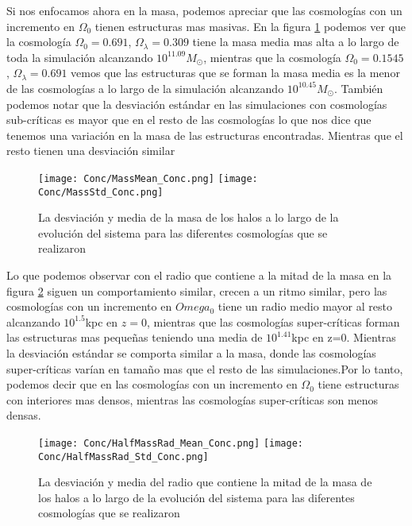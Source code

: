 Si nos enfocamos ahora en la masa, podemos apreciar que las cosmologías con un incremento en $\Omega_0$ tienen estructuras mas masivas. En la figura \ref{fig:Conc_Mass} podemos ver que la cosmología $\Omega_0=0.691$, $\Omega_\lambda=0.309$ tiene la masa media mas alta a lo largo de toda la simulación alcanzando $10^{11.09}M_\odot$, mientras que la cosmología $\Omega_0=0.1545$, $\Omega_\lambda=0.691$ vemos que las estructuras que se forman la masa media es la menor de las cosmologías a lo largo de la simulación alcanzando $10^{10.45} M_\odot$. También podemos notar que la desviación estándar en las simulaciones con cosmologías sub-críticas es mayor que en el resto de las cosmologías lo que nos dice que tenemos una variación en la masa de las estructuras encontradas. Mientras que el resto tienen una desviación similar 

\begin{figure}[H]
      \centering
      \texttt{[image: Conc/MassMean\_Conc.png]}
      \texttt{[image: Conc/MassStd\_Conc.png]}
      \caption[Evolución de la desviación y media de la masa de los halos para todas las cosmologías]{La desviación y media de la masa de los halos a lo largo de la evolución del sistema para las diferentes cosmologías que se realizaron}
      \label{fig:Conc_Mass}
\end{figure}

Lo que podemos observar con el radio que contiene a la mitad de la masa en la figura \ref{fig:Conc_HalfMassRad} siguen un comportamiento similar, crecen a un ritmo similar, pero las cosmologías con un incremento en $Omega_0$ tiene un radio medio mayor al resto alcanzando $10^1.5$kpc en $z=0$, mientras que las cosmologías super-críticas forman las estructuras mas pequeñas teniendo una media de $10^1.41$kpc en z=0. Mientras la desviación estándar se comporta similar a la masa, donde las cosmologías super-críticas varían en tamaño mas que el resto de las simulaciones.Por lo tanto, podemos decir que en las cosmologías con un incremento en $\Omega_0$ tiene estructuras con interiores mas densos, mientras las cosmologías super-críticas son menos densas.

\begin{figure}[H]
      \centering
      \texttt{[image: Conc/HalfMassRad\_Mean\_Conc.png]}
      \texttt{[image: Conc/HalfMassRad\_Std\_Conc.png]}
      \caption[Evolución de la desviación y media del radio que contiene la mitad de la masa de los halos para todas las cosmologías]{La desviación y media del radio que contiene la mitad de la masa de los halos a lo largo de la evolución del sistema para las diferentes cosmologías que se realizaron}
      \label{fig:Conc_HalfMassRad}
\end{figure}

